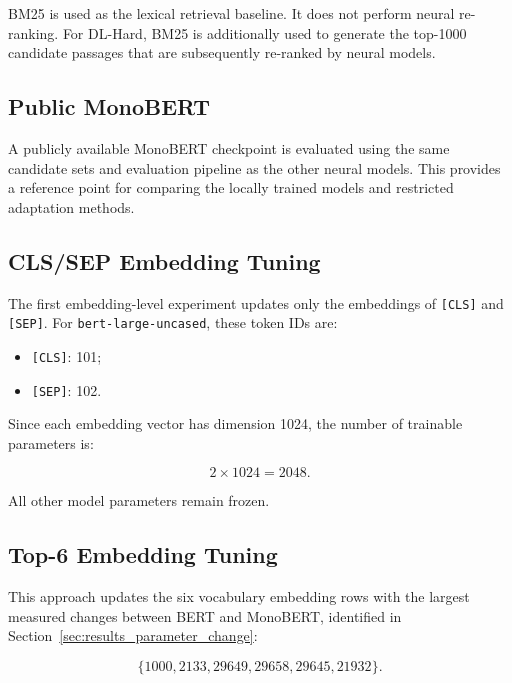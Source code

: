 BM25 is used as the lexical retrieval baseline. It does not perform neural re-ranking. For DL-Hard, BM25 is additionally used to generate the top-1000 candidate passages that are subsequently re-ranked by neural models.

\subsection{Public MonoBERT}
\label{subsec:methodology_public_monobert}

A publicly available MonoBERT checkpoint is evaluated using the same candidate sets and evaluation pipeline as the other neural models. This provides a reference point for comparing the locally trained models and restricted adaptation methods.

\subsection{CLS/SEP Embedding Tuning}
\label{subsec:methodology_cls_sep}

The first embedding-level experiment updates only the embeddings of \texttt{[CLS]} and \texttt{[SEP]}. For \texttt{bert-large-uncased}, these token IDs are:

\begin{itemize}
    \item \texttt{[CLS]}: 101;
    \item \texttt{[SEP]}: 102.
\end{itemize}

Since each embedding vector has dimension 1024, the number of trainable parameters is:

\begin{equation}
    2 \times 1024 = 2048.
\end{equation}

All other model parameters remain frozen.

\subsection{Top-6 Embedding Tuning}
\label{subsec:methodology_top6}

This approach updates the six vocabulary embedding rows with the largest measured changes between BERT and MonoBERT, identified in Section~\ref{sec:results_parameter_change}:

\begin{equation}
    \{1000, 2133, 29649, 29658, 29645, 21932\}.
\end{equation}

